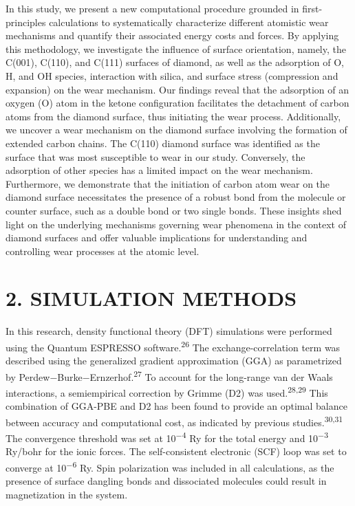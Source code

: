 \documentclass{article}
\begin{document}
In this study, we present a new computational procedure grounded in first-principles calculations to systematically characterize different atomistic wear mechanisms and quantify their associated energy costs and forces. By applying this methodology, we investigate the influence of surface orientation, namely, the C(001), C(110), and C(111) surfaces of diamond, as well as the adsorption of O, H, and OH species, interaction with silica, and surface stress (compression and expansion) on the wear mechanism. Our findings reveal that the adsorption of an oxygen (O) atom in the ketone configuration facilitates the detachment of carbon atoms from the diamond surface, thus initiating the wear process. Additionally, we uncover a wear mechanism on the diamond surface involving the formation of extended carbon chains. The C(110) diamond surface was identified as the surface that was most susceptible to wear in our study. Conversely, the adsorption of other species has a limited impact on the wear mechanism. Furthermore, we demonstrate that the initiation of carbon atom wear on the diamond surface necessitates the presence of a robust bond from the molecule or counter surface, such as a double bond or two single bonds. These insights shed light on the underlying mechanisms governing wear phenomena in the context of diamond surfaces and offer valuable implications for understanding and controlling wear processes at the atomic level.

\section*{2. SIMULATION METHODS}

In this research, density functional theory (DFT) simulations were performed using the Quantum ESPRESSO software.\textsuperscript{26} The exchange-correlation term was described using the generalized gradient approximation (GGA) as parametrized by Perdew−Burke−Ernzerhof.\textsuperscript{27} To account for the long-range van der Waals interactions, a semiempirical correction by Grimme (D2) was used.\textsuperscript{28,29} This combination of GGA-PBE and D2 has been found to provide an optimal balance between accuracy and computational cost, as indicated by previous studies.\textsuperscript{30,31} The convergence threshold was set at 10\textsuperscript{−4} Ry for the total energy and 10\textsuperscript{−3} Ry/bohr for the ionic forces. The self-consistent electronic (SCF) loop was set to converge at 10\textsuperscript{−6} Ry. Spin polarization was included in all calculations, as the presence of surface dangling bonds and dissociated molecules could result in magnetization in the system.
\end{document}
